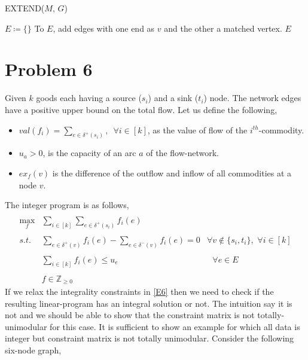 \documentclass{article}
\numberwithin{equation}{section}
\begin{document}
\begin{algorithm}[H]
    \caption{EXTEND($M, \, G$)}
    \begin{algorithmic}[1]
        \State $E \coloneqq \{\}$
            \State To $E$, add edges with one end as $v$ and the other a matched vertex. 
        \EndFor
        \State \Return $E$
    \end{algorithmic}
\end{algorithm}
\newpage
\section{Problem 6} %
Given $k$ goods each having a source ($s_i$) and a sink ($t_i$) node. The network edges have a positive upper bound on the total flow. Let us define the following, 
\begin{itemize}
    \item $val(f_i) = \sum_{e \in \delta^+(s_i)}, \, \, \, \forall i \in [k]$, as the value of flow of the $i^{th}$-commodity. 
    \item $u_a > 0$, is the capacity of an arc $a$ of the flow-network. 
    \item $ex_f(v)$ is the difference of the outflow and inflow of all commodities at a node $v$.
\end{itemize}
The integer program is as follows, 
\begin{equation}
    \label{E6}
    \begin{array}{rlc}
    \\
        \max_f& \sum_{i\in[k]}\sum_{e \in \delta^+(s_i)} f_i(e) &  \\\\
         s.t.& \sum_{e \in \delta^+(v)} f_i(e) - \sum_{e \in \delta^-(v)} f_i(e)=0 &\forall v \notin\{s_i, t_i\}, \, \, \forall i \in [k]\\\\
         &\sum_{i\in [k]} f_i(e)\le u_e & \, \, \, \, \forall e \in E\\\\
         &f\in \mathbb{Z}_{\ge 0}
    \end{array}
\end{equation}
If we relax the integrality constraints in \ref{E6} then we need to check if the resulting linear-program has an integral solution or not. The intuition say it is not and we should be able to show that the constraint matrix is not totally-unimodular for this case. It is sufficient to show an example for which all data is integer but constraint matrix is not totally unimodular. Consider the following six-node graph, 
\end{document}
